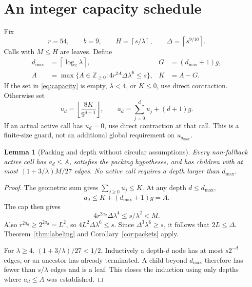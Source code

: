\documentclass[11pt,letterpaper]{article}
\numberwithin{equation}{section}
\newtheorem{lemma}[theorem]{Lemma}
\theoremstyle{definition}\newtheorem{definition}[theorem]{Definition}
\theoremstyle{remark}\newtheorem{remark}[theorem]{Remark}
\newcommand{\ceil}[1]{\left\lceil #1\right\rceil}
\newcommand{\floor}[1]{\left\lfloor #1\right\rfloor}
\begin{document}
\section{An integer capacity schedule}
\label{sec:schedule}

Fix
\[
 r=54,\qquad b=9,\qquad H=\ceil{s/\lambda},
 \qquad \Delta=\ceil{s^{9/10}}.
\]
Calls with $M\le H$ are leaves. Define
\begin{align}
 d_{\max}&=\ceil{\log_2\lambda},&
 G&=(d_{\max}+1)g,\label{eq:reserve}\\
 A&=\max\{A\in\mathbb Z_{\ge0}:
          4r^{2A}\Delta\lambda^6\le s\},&
 K&=A-G.\label{eq:capacity}
\end{align}
If the set in \eqref{eq:capacity} is empty, $\lambda<4$, or $K\le0$,
use direct contraction. Otherwise set
\begin{equation}
 u_d=\floor{\frac{8K}{9^{d+1}}},
 \qquad
 a_d=\sum_{j=0}^d u_j+(d+1)g.
 \label{eq:adaptive}
\end{equation}
If an actual active call has $u_d=0$, use direct contraction at that
call. This is a finite-size guard, not an additional global requirement
on $u_{d_{\max}}$.

\begin{lemma}[Packing and depth without circular assumptions]
\label{lem:capacity}
Every non-fallback active call has $a_d\le A$, satisfies the packing
hypotheses, and has children with at most $(1+3/\lambda)M/27$ edges.
No active call requires a depth larger than $d_{\max}$.
\end{lemma}
\begin{proof}
The geometric sum gives $\sum_{j\ge0}u_j\le K$.
At any depth $d\le d_{\max}$,
\[
 a_d\le K+(d_{\max}+1)g=A.
\]
The cap then gives
\[
 4r^{2a_d}\Delta\lambda^4\le s/\lambda^2<M.
\]
Also $r^{2a_d}\ge2^{2a_d}=L^2$, so
$4L^2\Delta\lambda^6\le s$. Since
$\Delta^3\lambda^6\ge s$, it follows that $2L\le\Delta$.
Theorem~\ref{thm:labeling} and Corollary~\ref{cor:packets} apply.

For $\lambda\ge4$, $(1+3/\lambda)/27<1/2$. Inductively a depth-$d$
node has at most $s2^{-d}$ edges, or an ancestor has already terminated.
A child beyond $d_{\max}$ therefore has fewer than $s/\lambda$ edges
and is a leaf. This closes the induction using only depths where
$a_d\le A$ was established.
\end{proof}
\end{document}
